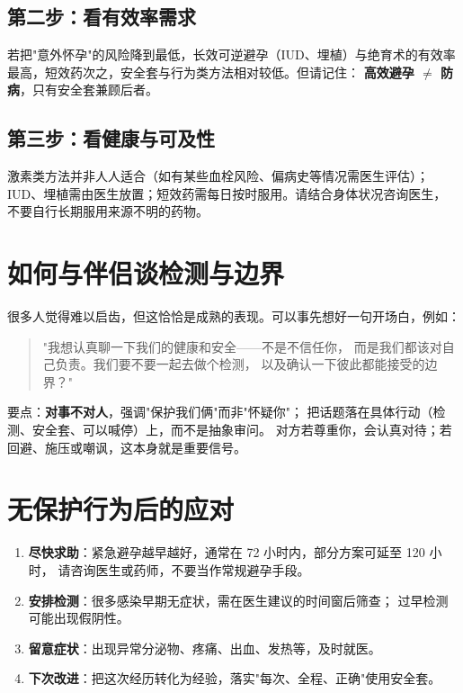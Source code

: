 \documentclass[12pt,UTF8,openany]{ctexbook}
\begin{document}
\subsection*{第二步：看有效率需求}

若把"意外怀孕"的风险降到最低，长效可逆避孕（IUD、埋植）与绝育术的有效率
最高，短效药次之，安全套与行为类方法相对较低。但请记住：
\textbf{高效避孕 $\neq$ 防病}，只有安全套兼顾后者。

\subsection*{第三步：看健康与可及性}

激素类方法并非人人适合（如有某些血栓风险、偏病史等情况需医生评估）；
IUD、埋植需由医生放置；短效药需每日按时服用。请结合身体状况咨询医生，
不要自行长期服用来源不明的药物。

\section{如何与伴侣谈检测与边界}

很多人觉得难以启齿，但这恰恰是成熟的表现。可以事先想好一句开场白，例如：

\begin{quote}
"我想认真聊一下我们的健康和安全——不是不信任你，
而是我们都该对自己负责。我们要不要一起去做个检测，
以及确认一下彼此都能接受的边界？"
\end{quote}

要点：\textbf{对事不对人}，强调"保护我们俩"而非"怀疑你"；
把话题落在具体行动（检测、安全套、可以喊停）上，而不是抽象审问。
对方若尊重你，会认真对待；若回避、施压或嘲讽，这本身就是重要信号。

\section{无保护行为后的应对}

\begin{enumerate}[leftmargin=2em,itemsep=0.3em]
  \item \textbf{尽快求助}：紧急避孕越早越好，通常在 72 小时内，部分方案可延至 120 小时，
        请咨询医生或药师，不要当作常规避孕手段。
  \item \textbf{安排检测}：很多感染早期无症状，需在医生建议的时间窗后筛查；
        过早检测可能出现假阴性。
  \item \textbf{留意症状}：出现异常分泌物、疼痛、出血、发热等，及时就医。
  \item \textbf{下次改进}：把这次经历转化为经验，落实"每次、全程、正确"使用安全套。
\end{enumerate}
\end{document}
